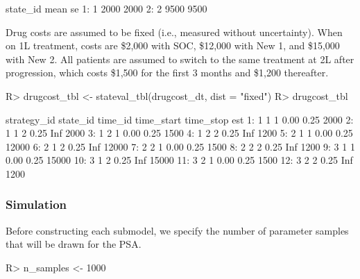 \documentclass[article, nojss]{jss}\usepackage[]{graphicx}\usepackage[]{color}
\begin{document}
\begin{Schunk}
\begin{Soutput}
   state_id mean   se
1:        1 2000 2000
2:        2 9500 9500
\end{Soutput}
\end{Schunk}

Drug costs are assumed to be fixed (i.e., measured without uncertainty). When on 1L treatment, costs are \$2,000 with SOC, \$12,000 with New 1, and \$15,000 with New 2. All patients are assumed to switch to the same treatment at 2L after progression, which costs \$1,500 for the first 3 months and \$1,200 thereafter.



\begin{Schunk}
\begin{Sinput}
R> drugcost_tbl <- stateval_tbl(drugcost_dt, dist = "fixed")
R> drugcost_tbl
\end{Sinput}
\begin{Soutput}
    strategy_id state_id time_id time_start time_stop   est
 1:           1        1       1       0.00      0.25  2000
 2:           1        1       2       0.25       Inf  2000
 3:           1        2       1       0.00      0.25  1500
 4:           1        2       2       0.25       Inf  1200
 5:           2        1       1       0.00      0.25 12000
 6:           2        1       2       0.25       Inf 12000
 7:           2        2       1       0.00      0.25  1500
 8:           2        2       2       0.25       Inf  1200
 9:           3        1       1       0.00      0.25 15000
10:           3        1       2       0.25       Inf 15000
11:           3        2       1       0.00      0.25  1500
12:           3        2       2       0.25       Inf  1200
\end{Soutput}
\end{Schunk}

\subsubsection{Simulation}
Before constructing each submodel, we specify the number of parameter samples that will be drawn for the PSA.

\begin{Schunk}
\begin{Sinput}
R> n_samples <- 1000
\end{Sinput}
\end{Schunk}
\end{document}
